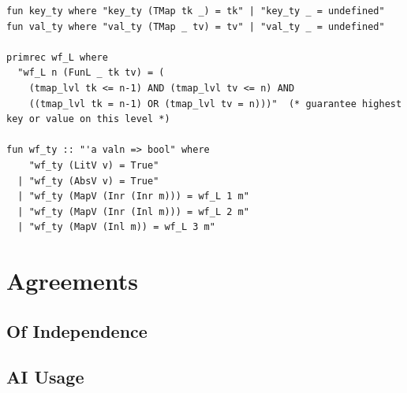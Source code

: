 \documentclass[11pt]{article}
\begin{document}
\begin{verbatim}
fun key_ty where "key_ty (TMap tk _) = tk" | "key_ty _ = undefined"
fun val_ty where "val_ty (TMap _ tv) = tv" | "val_ty _ = undefined"

primrec wf_L where
  "wf_L n (FunL _ tk tv) = (
    (tmap_lvl tk <= n-1) AND (tmap_lvl tv <= n) AND
    ((tmap_lvl tk = n-1) OR (tmap_lvl tv = n)))"  (* guarantee highest key or value on this level *)

fun wf_ty :: "'a valn => bool" where
    "wf_ty (LitV v) = True"
  | "wf_ty (AbsV v) = True"
  | "wf_ty (MapV (Inr (Inr m))) = wf_L 1 m"
  | "wf_ty (MapV (Inr (Inl m))) = wf_L 2 m"
  | "wf_ty (MapV (Inl m)) = wf_L 3 m"

\end{verbatim}


\pagebreak

\section*{Agreements}
\subsection*{Of Independence}
\subsection*{AI Usage}
\end{document}
